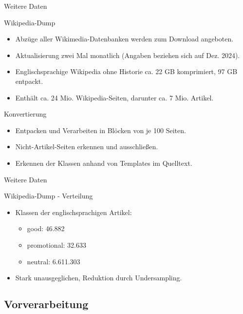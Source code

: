 \documentclass[aspectratio=169]{beamer} %
\begin{document}
\begin{frame}{Weitere Daten}
    \begin{block}{Wikipedia-Dump}
        \begin{itemize}
            \item Abzüge aller Wikimedia-Datenbanken werden zum Download angeboten.
            \item Aktualisierung zwei Mal monatlich (Angaben beziehen sich auf Dez. 2024).
            \item Englischsprachige Wikipedia ohne Historie ca. 22 GB komprimiert, 97 GB entpackt.
            \item Enthält ca. 24 Mio. Wikipedia-Seiten, darunter ca. 7 Mio. Artikel.
        \end{itemize}
    \end{block}
    \begin{block}{Konvertierung}
        \begin{itemize}
            \item Entpacken und Verarbeiten in Blöcken von je 100 Seiten.
            \item Nicht-Artikel-Seiten erkennen und ausschließen.
            \item Erkennen der Klassen anhand von Templates im Quelltext.
        \end{itemize}
    \end{block}
\end{frame}

\begin{frame}{Weitere Daten}
    \begin{block}{Wikipedia-Dump - Verteilung}
        \begin{itemize}
            \item Klassen der englischsprachigen Artikel:
                  \begin{itemize}
                      \item good: 46.882
                      \item promotional: 32.633
                      \item neutral: 6.611.303
                  \end{itemize}
            \item Stark unausgeglichen, Reduktion durch Undersampling.
        \end{itemize}
    \end{block}
\end{frame}

\subsection{Vorverarbeitung}
\end{document}
